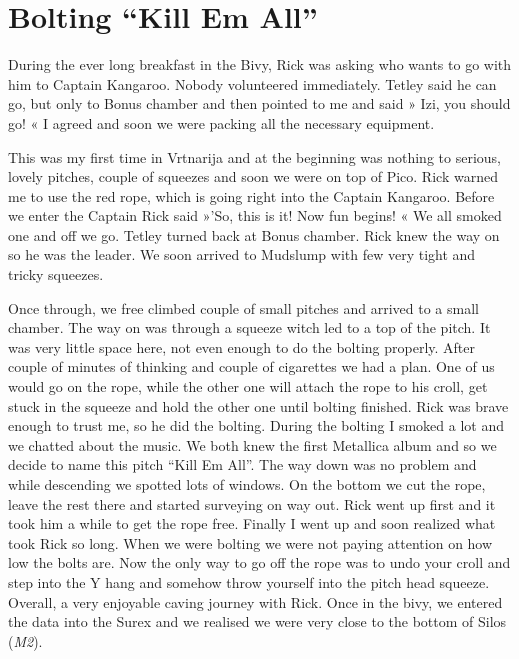 \hypertarget{bolting-kill-em-all}{%
\section{Bolting ``Kill Em All''}\label{bolting-kill-em-all}}

During the ever long breakfast in the Bivy, Rick was asking who wants to
go with him to Captain Kangaroo. Nobody volunteered immediately. Tetley
said he can go, but only to Bonus chamber and then pointed to me and
said » Izi, you should go! « I agreed and soon we were packing all the
necessary equipment.

This was my first time in Vrtnarija and at the beginning was nothing to
serious, lovely pitches, couple of squeezes and soon we were on top of
Pico. Rick warned me to use the red rope, which is going right into the
Captain Kangaroo. Before we enter the Captain Rick said »'So, this is
it! Now fun begins! « We all smoked one and off we go. Tetley turned
back at Bonus chamber. Rick knew the way on so he was the leader. We
soon arrived to Mudslump with few very tight and tricky squeezes.

Once through, we free climbed couple of small pitches and arrived to a
small chamber. The way on was through a squeeze witch led to a top of
the pitch. It was very little space here, not even enough to do the
bolting properly. After couple of minutes of thinking and couple of
cigarettes we had a plan. One of us would go on the rope, while the
other one will attach the rope to his croll, get stuck in the squeeze
and hold the other one until bolting finished. Rick was brave enough to
trust me, so he did the bolting. During the bolting I smoked a lot and
we chatted about the music. We both knew the first Metallica album and
so we decide to name this pitch ``Kill Em All''. The way down was no
problem and while descending we spotted lots of windows. On the bottom
we cut the rope, leave the rest there and started surveying on way out.
Rick went up first and it took him a while to get the rope free. Finally
I went up and soon realized what took Rick so long. When we were bolting
we were not paying attention on how low the bolts are. Now the only way
to go off the rope was to undo your croll and step into the Y hang and
somehow throw yourself into the pitch head squeeze. Overall, a very
enjoyable caving journey with Rick. Once in the bivy, we entered the
data into the Surex and we realised we were very close to the bottom of
Silos (\emph{M2}).

\attrib{\izi}

